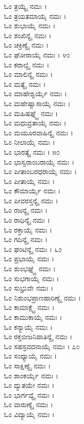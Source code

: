 \begin{multicols}{2}
ಓಂ ತ್ರಯ್ಯೈ ನಮಃ ।\\
ಓಂ ತ್ರಯತಮಾಯೈ ನಮಃ ।\\
ಓಂ ಶುಭಾಯೈ ನಮಃ ।\\
ಓಂ ಶಂಖಿನ್ಯೈ ನಮಃ ।\\
ಓಂ ಚಕ್ರಿಣ್ಯೈ ನಮಃ ।\\
ಓಂ ಘೋರಾಯೈ ನಮಃ । ೪೦\\
ಓಂ ಕರಾಲ್ಯೈ ನಮಃ ।\\
ಓಂ ಮಾಲಿನ್ಯೈ ನಮಃ ।\\
ಓಂ ಮತ್ಯೈ ನಮಃ ।\\
ಓಂ ಮಾಹೇಶ್ವರ್ಯೈ ನಮಃ ।\\
ಓಂ ಮಹೇಷ್ವಾಸಾಯೈ ನಮಃ ।\\
ಓಂ ಮಹಿಷಘ್ನ್ಯೈ ನಮಃ ।\\
ಓಂ ಮಧುವ್ರತಾಯೈ ನಮಃ ।\\
ಓಂ ಮಯೂರವಾಹಿನ್ಯೈ ನಮಃ ।\\
ಓಂ ನೀಲಾಯೈ ನಮಃ ।\\
ಓಂ ಭಾರತ್ಯೈ ನಮಃ । ೫೦\\
ಓಂ ಭಾಸ್ವರಾಂಬರಾಯೈ ನಮಃ ।\\
ಓಂ ಪೀತಾಂಬರಧರಾಯೈ ನಮಃ ।\\
ಓಂ ಪೀತಾಯೈ ನಮಃ ।\\
ಓಂ ಕೌಮಾರ್ಯೈ ನಮಃ ।\\
ಓಂ ಪೀವರಸ್ತನ್ಯೈ ನಮಃ ।\\
ಓಂ ರಜನ್ಯೈ ನಮಃ ।\\
ಓಂ ರಾಧಿನ್ಯೈ ನಮಃ ।\\
ಓಂ ರಕ್ತಾಯೈ ನಮಃ ।\\
ಓಂ ಗದಿನ್ಯೈ ನಮಃ ।\\
ಓಂ ಘಂಟಿನ್ಯೈ ನಮಃ । ೬೦\\
ಓಂ ಪ್ರಭಾಯೈ ನಮಃ ।\\
ಓಂ ಶುಂಭಘ್ನ್ಯೈ ನಮಃ ।\\
ಓಂ ಸುಭಗಾಯೈ ನಮಃ ।\\
ಓಂ ಸುಭ್ರುವೇ ನಮಃ ।\\
ಓಂ ನಿಶುಂಭಪ್ರಾಣಹಾರಿಣ್ಯೈ ನಮಃ ।\\
ಓಂ ಕಾಮಾಕ್ಷ್ಯೈ ನಮಃ ।\\
ಓಂ ಕಾಮುಕಾಯೈ ನಮಃ ।\\
ಓಂ ಕನ್ಯಾಯೈ ನಮಃ ।\\
ಓಂ ರಕ್ತಬೀಜನಿಪಾತಿನ್ಯೈ ನಮಃ ।\\
ಓಂ ಸಹಸ್ರವದನಾಯೈ ನಮಃ । ೭೦\\
ಓಂ ಸಂಧ್ಯಾಯೈ ನಮಃ ।\\
ಓಂ ಸಾಕ್ಷಿಣ್ಯೈ ನಮಃ ।\\
ಓಂ ಶಾಂಕರ್ಯೈ ನಮಃ ।\\
ಓಂ ದ್ಯುತಯೇ ನಮಃ ।\\
ಓಂ ಭಾರ್ಗವ್ಯೈ ನಮಃ ।\\
ಓಂ ವಾರುಣ್ಯೈ ನಮಃ ।\\
ಓಂ ವಿದ್ಯಾಯೈ ನಮಃ ।\\

\end{multicols}

